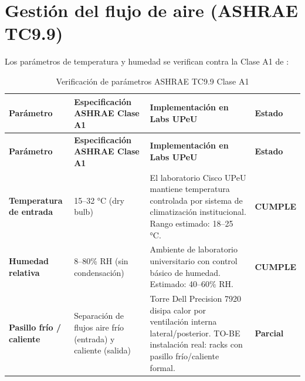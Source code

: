 \documentclass[11pt, a4paper, oneside]{report}
\begin{document}
\section{Gestión del flujo de aire (ASHRAE TC9.9)}

Los parámetros de temperatura y humedad se verifican contra la Clase A1 de \citet{ashraetc99}:

\renewcommand{\arraystretch}{1.3}
\footnotesize
{}

\begin{xltabular}{\textwidth}{@{}|L{3cm}|L{3.6cm}|X|C{2cm}|@{}}
\caption{Verificación de parámetros ASHRAE TC9.9 Clase A1}
\label{tab:ashrae_verificacion} \\

\parbox[c][1.1cm][c]{\linewidth}{\centering\color{white}\bfseries\small Parámetro} &
\parbox[c][1.1cm][c]{\linewidth}{\centering\color{white}\bfseries\small Especificación ASHRAE Clase A1} &
\parbox[c][1.1cm][c]{\linewidth}{\centering\color{white}\bfseries\small Implementación en Labs UPeU} &
\parbox[c][1.1cm][c]{\linewidth}{\centering\color{white}\bfseries\small Estado} \\ \hline
\endfirsthead

\parbox[c][1.1cm][c]{\linewidth}{\centering\color{white}\bfseries\small Parámetro} &
\parbox[c][1.1cm][c]{\linewidth}{\centering\color{white}\bfseries\small Especificación ASHRAE Clase A1} &
\parbox[c][1.1cm][c]{\linewidth}{\centering\color{white}\bfseries\small Implementación en Labs UPeU} &
\parbox[c][1.1cm][c]{\linewidth}{\centering\color{white}\bfseries\small Estado} \\ \hline
\endhead

\hline
\endfoot

{\small \textbf{Temperatura de entrada}} & {\small 15--32 °C (dry bulb)} & {\small El laboratorio Cisco UPeU mantiene temperatura controlada por sistema de climatización institucional. Rango estimado: 18--25 °C.} & {\small \textcolor{sev_bajo}{\textbf{CUMPLE}}} \\ \hline

{\small \textbf{Humedad relativa}} & {\small 8--80\% RH (sin condensación)} & {\small Ambiente de laboratorio universitario con control básico de humedad. Estimado: 40--60\% RH.} & {\small \textcolor{sev_bajo}{\textbf{CUMPLE}}} \\ \hline

{\small \textbf{Pasillo frío / caliente}} & {\small Separación de flujos aire frío (entrada) y caliente (salida)} & {\small Torre Dell Precision 7920 disipa calor por ventilación interna lateral/posterior. TO-BE instalación real: racks con pasillo frío/caliente formal.} & {\small \textcolor{sev_medio}{\textbf{Parcial}}} \\ \hline


\end{xltabular}
\end{document}

